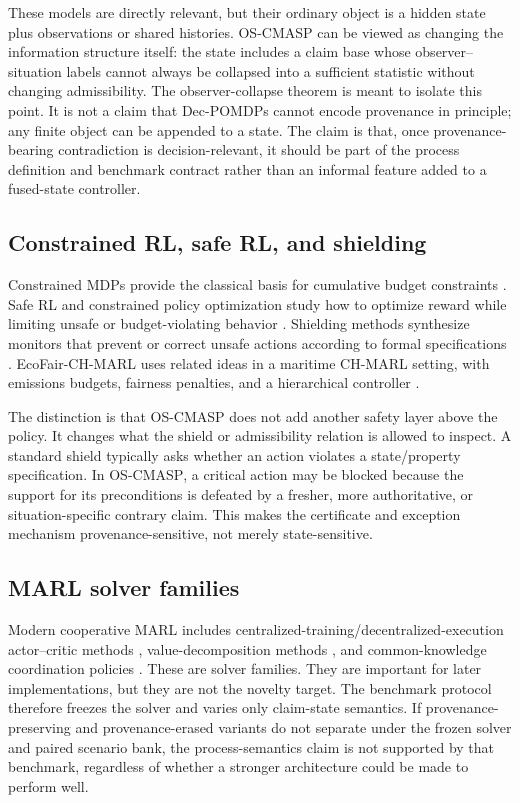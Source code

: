 \documentclass[11pt]{article}
\newcommand{\OSCMASP}{\mbox{\normalfont\textsc{OS-CMASP}}}
\newcommand{\1}{\mathbf{1}}
\theoremstyle{definition}
\theoremstyle{plain}
\theoremstyle{remark}
\begin{document}
These models are directly relevant, but their ordinary object is a hidden state plus observations or shared histories. \OSCMASP{} can be viewed as changing the information structure itself: the state includes a claim base whose observer--situation labels cannot always be collapsed into a sufficient statistic without changing admissibility. The observer-collapse theorem is meant to isolate this point. It is not a claim that Dec-POMDPs cannot encode provenance in principle; any finite object can be appended to a state. The claim is that, once provenance-bearing contradiction is decision-relevant, it should be part of the process definition and benchmark contract rather than an informal feature added to a fused-state controller.

\subsection{Constrained RL, safe RL, and shielding}

Constrained MDPs provide the classical basis for cumulative budget constraints \citep{Altman1999}. Safe RL and constrained policy optimization study how to optimize reward while limiting unsafe or budget-violating behavior \citep{GarciaFernandez2015,Achiam2017,Chow2018}. Shielding methods synthesize monitors that prevent or correct unsafe actions according to formal specifications \citep{Alshiekh2018,Carr2023ShieldingPOMDP}. EcoFair-CH-MARL uses related ideas in a maritime CH-MARL setting, with emissions budgets, fairness penalties, and a hierarchical controller \citep{Alqithami2025CHMARL,Alqithami2026EcoFair}.

The distinction is that \OSCMASP{} does not add another safety layer above the policy. It changes what the shield or admissibility relation is allowed to inspect. A standard shield typically asks whether an action violates a state/property specification. In \OSCMASP, a critical action may be blocked because the support for its preconditions is defeated by a fresher, more authoritative, or situation-specific contrary claim. This makes the certificate and exception mechanism provenance-sensitive, not merely state-sensitive.

\subsection{MARL solver families}

Modern cooperative MARL includes centralized-training/decentralized-execution actor--critic methods \citep{Lowe2017,Foerster2018COMA}, value-decomposition methods \citep{Sunehag2018VDN,Rashid2018QMIX}, and common-knowledge coordination policies \citep{SchroederdeWitt2019MACKRL}. These are solver families. They are important for later implementations, but they are not the novelty target. The benchmark protocol therefore freezes the solver and varies only claim-state semantics. If provenance-preserving and provenance-erased variants do not separate under the frozen solver and paired scenario bank, the process-semantics claim is not supported by that benchmark, regardless of whether a stronger architecture could be made to perform well.
\end{document}
